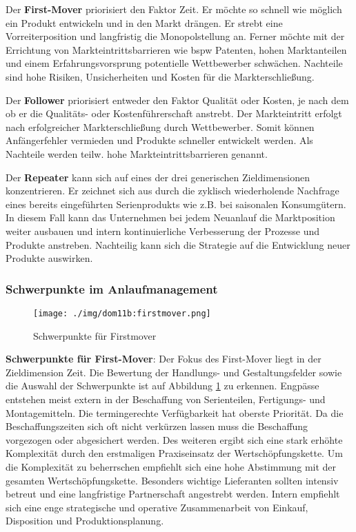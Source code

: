Der \textbf{First-Mover} priorisiert den Faktor Zeit. Er möchte so schnell wie möglich ein Produkt entwickeln und in den Markt drängen. Er strebt eine Vorreiterposition und langfristig die Monopolstellung an. Ferner möchte mit der Errichtung von Markteintrittsbarrieren wie \gls{bspw} Patenten, hohen Marktanteilen und einem Erfahrungsvorsprung potentielle Wettbewerber schwächen. 
Nachteile sind hohe Risiken, Unsicherheiten und Kosten für die Markterschließung. 

Der \textbf{Follower} priorisiert entweder den Faktor Qualität oder Kosten, je nach dem ob er die Qualitäts- oder Kostenführerschaft anstrebt. Der Markteintritt erfolgt nach erfolgreicher Markterschließung durch Wettbewerber. Somit können Anfängerfehler vermieden und Produkte schneller entwickelt werden. Als Nachteile werden teilw. hohe Markteintrittsbarrieren genannt. 

Der \textbf{Repeater} kann sich auf eines der drei generischen Zieldimensionen konzentrieren. Er zeichnet sich aus durch die zyklisch wiederholende Nachfrage eines bereits eingeführten Serienprodukts wie z.B. bei saisonalen Konsumgütern. In diesem Fall kann das Unternehmen bei jedem Neuanlauf die Marktposition weiter ausbauen und intern kontinuierliche Verbesserung der Prozesse und Produkte anstreben. Nachteilig kann sich die Strategie auf die Entwicklung neuer Produkte auswirken. 

\subsubsection{Schwerpunkte im Anlaufmanagement}

\begin{figure}[ht]
 \centering
 \texttt{[image: ./img/dom11b:firstmover.png]}
 \caption{Schwerpunkte für Firstmover \cite{Dombrowski2011b}}
 \label{fig:dom11b:firstmover}
\end{figure}
\textbf{Schwerpunkte für First-Mover}: Der Fokus des First-Mover liegt in der Zieldimension Zeit. 
Die Bewertung der Handlungs- und Gestaltungsfelder sowie die Auswahl der Schwerpunkte ist auf Abbildung \ref{fig:dom11b:firstmover} zu erkennen. 
%
Engpässe entstehen meist extern in der Beschaffung von Serienteilen, Fertigungs- und Montagemitteln. Die termingerechte Verfügbarkeit hat oberste Priorität. Da die Beschaffungszeiten sich oft nicht verkürzen lassen muss die Beschaffung vorgezogen oder abgesichert werden. 
Des weiteren ergibt sich eine stark erhöhte Komplexität durch den erstmaligen Praxiseinsatz der Wertschöpfungskette. Um die Komplexität zu beherrschen empfiehlt sich eine hohe Abstimmung mit der gesamten Wertschöpfungskette. 
Besonders wichtige Lieferanten sollten intensiv betreut und eine langfristige Partnerschaft angestrebt werden. 
Intern empfiehlt sich eine enge strategische und operative Zusammenarbeit von Einkauf, Disposition und Produktionsplanung. 

